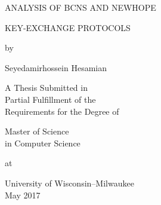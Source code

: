 \begin{titlepage}
    \begin{center}
        \vspace*{1cm}
        {\huge \MakeUppercase{Analysis of BCNS and NewHope}}
        
        \vspace{0.7cm}
        
        {\huge \MakeUppercase{Key-Exchange Protocols}}
        
        \vspace{2.7cm}

        {\large by}
        
        \vspace{1cm}
        
        {\LARGE Seyedamirhossein Hesamian}
        
        \vspace{4cm}
                
         {\large A Thesis Submitted in\\
        Partial Fulfillment of the\\
        Requirements for the Degree of}
        
        \vspace{2cm}
        
        {\large Master of Science\\
        in Computer Science}
        
        \vspace{2cm}
        
         {\large at}
        
        University of Wisconsin–Milwaukee\\
        May 2017
    \end{center}
\end{titlepage}